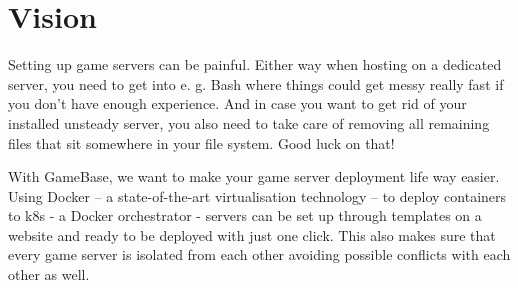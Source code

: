 \documentclass[a4paper,12pt,chapterprefix=false,bibliography=totoc,listof=totoc,]{scrreprt}
\begin{document}
\section{Vision}
Setting up game servers can be painful. Either way when hosting on a dedicated server, you need to get into e. g. Bash where things could get messy really fast if you don't have enough experience. And in case you want to get rid of your installed unsteady server, you also need to take care of removing all remaining files that sit somewhere in your file system. Good luck on that!

With GameBase, we want to make your game server deployment life way easier. Using Docker – a state-of-the-art virtualisation technology – to deploy containers to \gls{k8s} - a Docker orchestrator - servers can be set up through templates on a website and ready to be deployed with just one click. This also makes sure that every game server is isolated from each other avoiding possible conflicts with each other as well.
\end{document}
